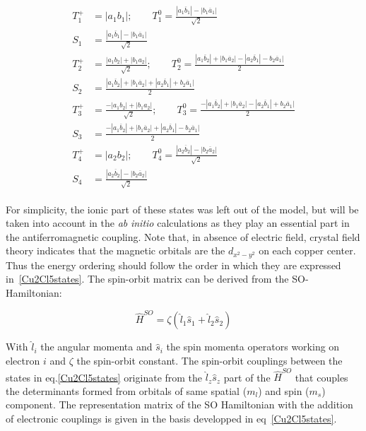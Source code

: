 \documentclass[12pt]{report}
\numberwithin{equation}{section}
\begin{document}
\begin{align}
    \begin{split}
    T_1^+&=|a_1b_1| ; \qquad T_1^0= \frac{|a_1 \overline{b}_1|-|b_1\overline{a}_1|}{\sqrt{2}}\\
    S_1&=\frac{|a_1 \overline{b}_1|-|b_1\overline{a}_1|}{\sqrt{2}}\\
    T_2^+&=\frac{|a_1b_2|+|b_1a_2|}{\sqrt{2}} ;\qquad T_2^0=\frac{|a_1\overline{b}_2|+|b_1\overline{a}_2|-|a_2\overline{b}_1|-b_2\overline{a}_1|}{2}\\
    S_2&=\frac{|a_1\overline{b}_2|+|b_1\overline{a}_2|+|a_2\overline{b}_1|+b_2\overline{a}_1|}{2}\\
    T_3^+&=\frac{-|a_1b_2|+|b_1a_2|}{\sqrt{2}} ;\qquad T_3^0=\frac{-|a_1\overline{b}_2|+|b_1\overline{a}_2|-|a_2\overline{b}_1|+b_2\overline{a}_1|}{2}\\
    S_3&=\frac{-|a_1\overline{b}_2|+|b_1\overline{a}_2|+|a_2\overline{b}_1|-b_2\overline{a}_1|}{2}\\
    T_4^+&=|a_2b_2| ; \qquad T_4^0= \frac{|a_2 \overline{b}_2|-|b_2\overline{a}_2|}{\sqrt{2}}\\
    S_4&=\frac{|a_2 \overline{b}_2|-|b_2\overline{a}_2|}{\sqrt{2}} 
    \end{split}
    \label{Cu2Cl5states}
\end{align}

For simplicity, the ionic part of these states was left out of the model, but will be taken into account in the \textit{ab} \textit{initio} calculations as they play an essential part in the antiferromagnetic coupling.
Note that, in absence of electric field, crystal field theory indicates that the magnetic orbitals are the $d_{x^2-y^2}$ on each copper center. Thus the energy ordering should follow the order in which they are expressed in~\ref{Cu2Cl5states}.
The spin-orbit matrix can be derived from the SO-Hamiltonian:

\begin{equation}
    \hat{H}^{SO}=\zeta (\hat{l}_1 \hat{s}_1 +\hat{l}_2\hat{s}_2)
\end{equation}

With $\hat{l}_i$ the angular momenta and $\hat{s}_i$ the spin momenta operators working on electron $i$ and $\zeta$ the spin-orbit constant.
The spin-orbit couplings between the states in eq.\ref{Cu2Cl5states} originate from the $\hat{l}_z\hat{s}_z$ part of the $\hat{H}^{SO}$ that couples the determinants formed from orbitals of same spatial ($m_l$) and spin ($m_s$) component.
The representation matrix of the SO Hamiltonian with the addition of electronic couplings is given in the basis developped in eq~\ref{Cu2Cl5states}.
\end{document}
